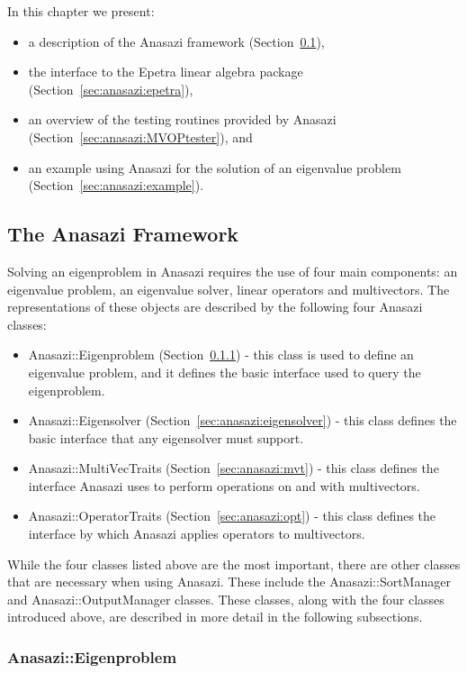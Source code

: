In this chapter we present:
\begin{itemize}
\item a description of the Anasazi framework (Section~\ref{sec:anasazi:framework}),
\item the interface to the Epetra linear algebra package
(Section~\ref{sec:anasazi:epetra}), 
\item an overview of the testing routines provided by Anasazi
(Section~\ref{sec:anasazi:MVOPtester}), and
\item an example using Anasazi for the solution of an eigenvalue problem 
(Section~\ref{sec:anasazi:example}).
\end{itemize}


\subsection{The Anasazi Framework}
\label{sec:anasazi:framework}

Solving an eigenproblem in Anasazi requires the use of four main components: an
eigenvalue problem, an eigenvalue solver, linear operators and multivectors.
The representations of these objects are described by the following four Anasazi
classes:
\begin{itemize}
\item Anasazi::Eigenproblem (Section~\ref{sec:anasazi:eigenproblem}) -
this class is used to define an eigenvalue problem, and it
defines the basic interface used to query the eigenproblem.
\item Anasazi::Eigensolver (Section~\ref{sec:anasazi:eigensolver}) - this class defines the basic interface that any
eigensolver must support.
\item Anasazi::MultiVecTraits (Section~\ref{sec:anasazi:mvt}) - this class defines the interface Anasazi uses to 
perform operations on and with multivectors.
\item Anasazi::OperatorTraits (Section~\ref{sec:anasazi:opt}) - this class defines the interface by which Anasazi
applies operators to multivectors.
\end{itemize}

While the four classes listed above are the most important, there are other
classes that are necessary when using Anasazi. These include the
Anasazi::SortManager and Anasazi::OutputManager classes. These classes, along
with the four classes introduced above, are described in more detail in the
following subsections.

\subsubsection{Anasazi::Eigenproblem}
\label{sec:anasazi:eigenproblem}

